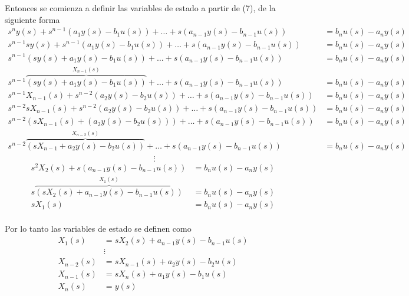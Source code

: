 Entonces se comienza a definir las variables de estado a partir de (7), de la siguiente forma
\[
    \begin{split}
        s^{n}y(s) + s^{n-1}(a_{1}y(s)-b_{1}u(s)) 
        + \ldots + s(a_{n-1}y(s)-b_{n-1}u(s)) & = b_{n}u(s)-a_{n}y(s)\\
        s^{n-1}sy(s) + s^{n-1}(a_{1}y(s)-b_{1}u(s)) 
        + \ldots + s(a_{n-1}y(s)-b_{n-1}u(s)) & = b_{n}u(s)-a_{n}y(s)\\
        s^{n-1}(sy(s)+a_{1}y(s)-b_{1}u(s))+ \ldots + s(a_{n-1}y(s)-b_{n-1}u(s)) & = b_{n}u(s)-a_{n}y(s)\\
        s^{n-1}
        \overbrace{(sy(s)+a_{1}y(s)-b_{1}u(s))}^{X_{n-1}(s)} + \ldots + s(a_{n-1}y(s)-b_{n-1}u(s)) & = b_{n}u(s)-a_{n}y(s)\\
        s^{n-1}X_{n-1}(s)+s^{n-2}(a_{2}y(s)-b_{2}u(s)) + \ldots + s(a_{n-1}y(s)-b_{n-1}u(s)) & = b_{n}u(s)-a_{n}y(s)\\
        s^{n-2}sX_{n-1}(s)+s^{n-2}(a_{2}y(s)-b_{2}u(s)) + \ldots + s(a_{n-1}y(s)-b_{n-1}u(s)) & = b_{n}u(s)-a_{n}y(s)\\
        s^{n-2}(sX_{n-1}(s)+(a_{2}y(s)-b_{2}u(s))) + \ldots + s(a_{n-1}y(s)-b_{n-1}u(s)) & = b_{n}u(s)-a_{n}y(s)\\
        s^{n-2}
        \overbrace{(sX_{n-1}+a_{2}y(s)-b_{2}u(s))}^{X_{n-2}(s)} + \ldots + s(a_{n-1}y(s)-b_{n-1}u(s)) & = b_{n}u(s)-a_{n}y(s)\\
    \end{split}
\]
\[
    \;\vdots
\]
\[
    \begin{split}
        s^{2}X_{2}(s)+s(a_{n-1}y(s)-b_{n-1}u(s)) & = b_{n}u(s)-a_{n}y(s)\\
        s
        \overbrace{(sX_{2}(s)+a_{n-1}y(s)-b_{n-1}u(s))}^{X_{1}(s)} & = b_{n}u(s)-a_{n}y(s)\\
        sX_{1}(s) & = b_{n}u(s)-a_{n}y(s)\\
    \end{split}
\]

Por lo tanto las variables de estado se definen como
\[
    \begin{split}
        X_{1}(s) & = sX_{2}(s)+a_{n-1}y(s)-b_{n-1}u(s)\\
        &\vdots\\
        X_{n-2}(s) & = sX_{n-1}(s)+a_{2}y(s)-b_{2}u(s)\\
        X_{n-1}(s) & = sX_{n}(s)+a_{1}y(s)-b_{1}u(s)\\
        X_{n}(s) & = y(s)
    \end{split}
\]

